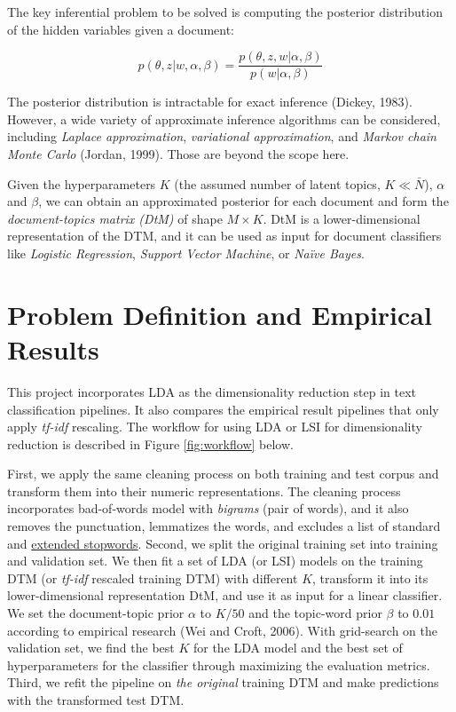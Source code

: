 \documentclass{article}
\begin{document}
The key inferential problem to be solved is computing the posterior distribution of the hidden variables given a document:

$$p(\theta, z|w, \alpha, \beta)=\frac{p(\theta, z, w|\alpha, \beta)}{p(w|\alpha, \beta)}$$

The posterior distribution is intractable for exact inference (Dickey, 1983). However, a wide variety of approximate
inference algorithms can be considered, including \emph{Laplace approximation}, \emph{variational approximation}, and \emph{Markov chain Monte Carlo} (Jordan, 1999). Those are beyond the scope here.

Given the hyperparameters $K$ (the assumed number of latent topics, $K\ll \bar{N}$), $\alpha$ and $\beta$, we can obtain an approximated posterior for each document and form the \emph{document-topics matrix (DtM)} of shape $M \times K$. DtM is a lower-dimensional representation of the DTM, and it can be used as input for document classifiers like \emph{Logistic Regression}, \emph{Support Vector Machine}, or \emph{Na\"ive Bayes}.

\section{Problem Definition and Empirical Results}
\label{results}

This project incorporates LDA as the dimensionality reduction step in text classification pipelines. It also compares the empirical result pipelines that only apply \emph{tf-idf} rescaling. The workflow for using LDA or LSI for dimensionality reduction is described in Figure \ref{fig:workflow} below.

First, we apply the same cleaning process on both training and test corpus and transform them into their numeric representations. The cleaning process incorporates bad-of-words model with \emph{bigrams} (pair of words), and it also removes the punctuation, lemmatizes the words, and excludes a list of standard and \href{https://github.com/KunyuHe/Dimensionality-Reduction-for-Text-Classification-with-LDA/blob/master/data/extended_stopwords.txt}{extended stopwords}. Second, we split the original training set into training and validation set. We then fit a set of LDA (or LSI) models on the training DTM (or \emph{tf-idf} rescaled training DTM) with different $K$, transform it into its lower-dimensional representation DtM, and use it as input for a linear classifier. We set the document-topic prior $\alpha$ to $K/50$ and the topic-word prior $\beta$ to $0.01$ according to empirical research (Wei and Croft, 2006). With grid-search on the validation set, we find the best $K$ for the LDA model and the best set of hyperparameters for the classifier through maximizing the evaluation metrics. Third, we refit the pipeline on \emph{the original} training DTM and make predictions with the transformed test DTM.  
\end{document}
